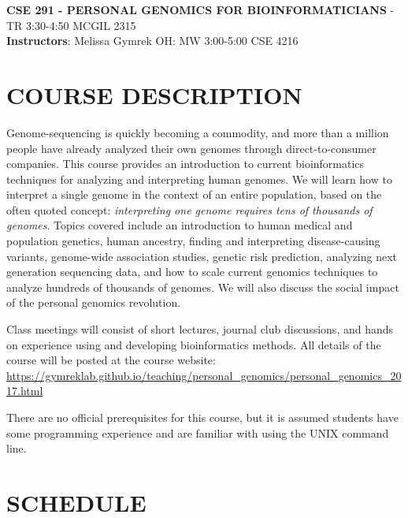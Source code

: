 \documentclass[12pt]{article}
\begin{document}
\textbf{CSE 291 - PERSONAL GENOMICS FOR BIOINFORMATICIANS} - TR 3:30-4:50 MCGIL 2315 \\
\textbf{Instructors}: Melissa Gymrek OH: MW 3:00-5:00 CSE 4216 \\

\section*{COURSE DESCRIPTION}
Genome-sequencing is quickly becoming a commodity, and more than a million people have already analyzed their own genomes through direct-to-consumer companies. This course provides an introduction to current bioinformatics techniques for analyzing and interpreting human genomes. We will learn how to interpret a single genome in the context of an entire population, based on the often quoted concept: \emph{interpreting one genome requires tens of thousands of genomes}. Topics covered include an introduction to human medical and population genetics, human ancestry, finding and interpreting disease-causing variants, genome-wide association studies, genetic risk prediction, analyzing next generation sequencing data, and how to scale current genomics techniques to analyze hundreds of thousands of genomes. We will also discuss the social impact of the personal genomics revolution.

Class meetings will consist of short lectures, journal club discussions, and hands on experience using and developing bioinformatics methods. All details of the course will be posted at the course website:\\
\href{https://gymreklab.github.io/teaching/personal\_genomics/personal\_genomics_2017.html}{https://gymreklab.github.io/teaching/personal\_genomics/personal\_genomics\_2017.html}

There are no official prerequisites for this course, but it is assumed students have some programming experience and are familiar with using the UNIX command line.




\section*{SCHEDULE}
\end{document}
